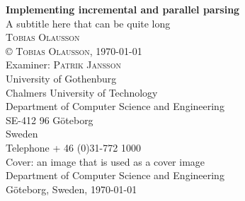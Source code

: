 \begin{titlepage}
\noindent \textbf{Implementing incremental and parallel parsing}\\
A subtitle here that can be quite long \\

\noindent \textsc{Tobias Olausson} \\

\noindent \copyright \textsc{ Tobias Olausson}, \monthdate\today \\

\noindent Examiner: \textsc{Patrik Jansson} \\

\noindent University of Gothenburg \\
Chalmers University of Technology \\
Department of Computer Science and Engineering \\
SE-412 96 Göteborg \\
Sweden \\
Telephone + 46 (0)31-772 1000 \\

\vfill
\noindent Cover: an image that is used as a cover image \\

\noindent Department of Computer Science and Engineering \\
Göteborg, Sweden, \monthdate\today
\end{titlepage}
